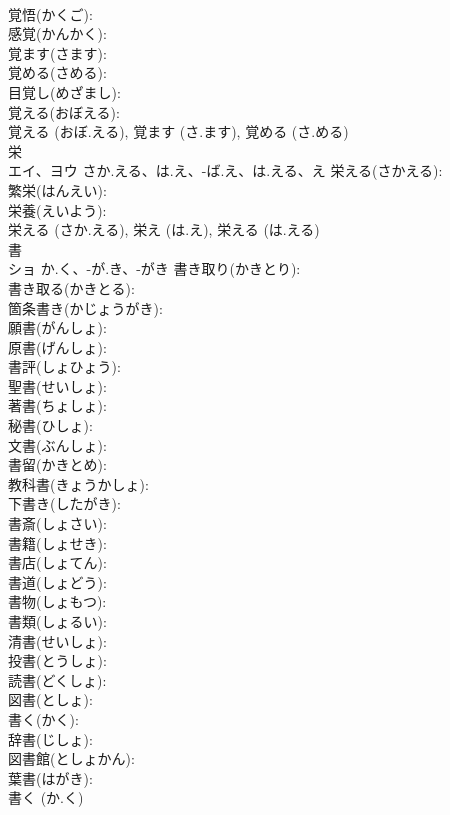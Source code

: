 \documentclass[8pt]{extreport}
\begin{document}
\begin{CJK}{UTF8}{min}
\\	覚悟(かくご): 
\\	感覚(かんかく): 
\\	覚ます(さます): 
\\	覚める(さめる): 
\\	目覚し(めざまし): 
\\	覚える(おぼえる): 
\\	覚える (おぼ.える), 覚ます (さ.ます), 覚める (さ.める)
\\	栄			
\\	エイ、ヨウ	さか.える、は.え、-ば.え、は.える、え	栄える(さかえる): 
\\	繁栄(はんえい): 
\\	栄養(えいよう): 
\\	栄える (さか.える), 栄え (は.え), 栄える (は.える)
\\	書			
\\	ショ	か.く、-が.き、-がき	書き取り(かきとり): 
\\	書き取る(かきとる): 
\\	箇条書き(かじょうがき): 
\\	願書(がんしょ): 
\\	原書(げんしょ): 
\\	書評(しょひょう): 
\\	聖書(せいしょ): 
\\	著書(ちょしょ): 
\\	秘書(ひしょ): 
\\	文書(ぶんしょ): 
\\	書留(かきとめ): 
\\	教科書(きょうかしょ): 
\\	下書き(したがき): 
\\	書斎(しょさい): 
\\	書籍(しょせき): 
\\	書店(しょてん): 
\\	書道(しょどう): 
\\	書物(しょもつ): 
\\	書類(しょるい): 
\\	清書(せいしょ): 
\\	投書(とうしょ): 
\\	読書(どくしょ): 
\\	図書(としょ): 
\\	書く(かく): 
\\	辞書(じしょ): 
\\	図書館(としょかん): 
\\	葉書(はがき): 
\\	書く (か.く)

\end{CJK}
\end{document}
